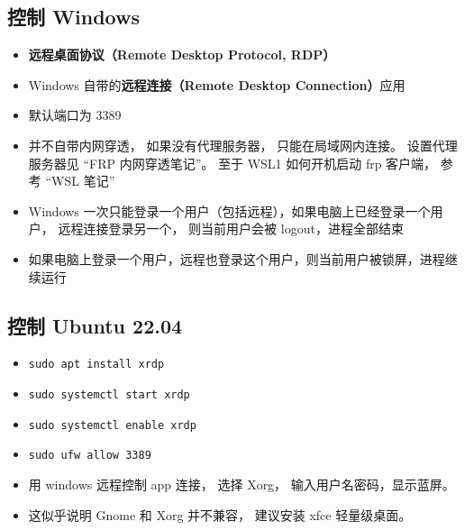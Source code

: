 
\begin{issues}
\issueDraft
\end{issues}

\subsection{控制 Windows}
\begin{itemize}
\item \textbf{远程桌面协议（Remote Desktop Protocol, RDP）}
\item Windows 自带的\textbf{远程连接（Remote Desktop Connection）}应用
\item 默认端口为 3389
\item 并不自带内网穿透， 如果没有代理服务器， 只能在局域网内连接。 设置代理服务器见 “FRP 内网穿透笔记”。 至于 WSL1 如何开机启动 frp 客户端， 参考 “WSL 笔记”
\item Windows 一次只能登录一个用户（包括远程），如果电脑上已经登录一个用户， 远程连接登录另一个， 则当前用户会被 logout，进程全部结束
\item 如果电脑上登录一个用户，远程也登录这个用户，则当前用户被锁屏，进程继续运行
\end{itemize}

\subsection{控制 Ubuntu 22.04}
\begin{itemize}
\item \verb|sudo apt install xrdp|
\item \verb|sudo systemctl start xrdp|
\item \verb|sudo systemctl enable xrdp|
\item \verb|sudo ufw allow 3389|
\item 用 windows 远程控制 app 连接， 选择 Xorg， 输入用户名密码，显示蓝屏。
\item 这似乎说明 Gnome 和 Xorg 并不兼容， 建议安装 xfce 轻量级桌面。
\end{itemize}
